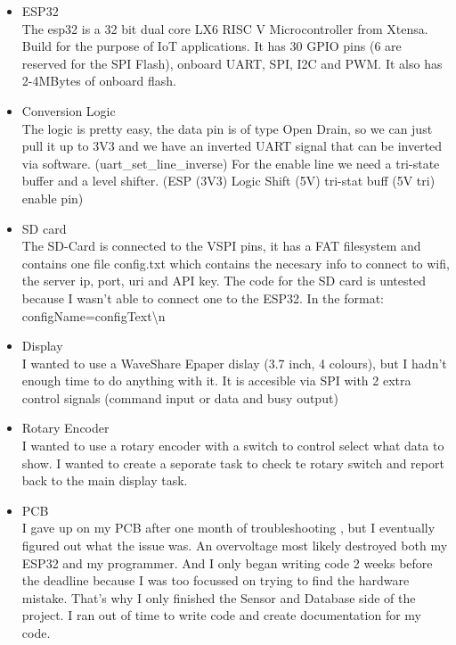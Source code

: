 \documentclass[a4paper,twoside, 12pt]{report}
\theoremstyle{break}
\begin{document}
\begin{itemize}
\item ESP32\\
The esp32 is a 32 bit dual core LX6 RISC V Microcontroller from Xtensa. Build for the purpose of IoT applications. It has 30 GPIO pins (6 are reserved for the SPI Flash), onboard UART, SPI, I2C and PWM. It also has 2-4MBytes of onboard flash.
\item Conversion Logic\\
The logic is pretty easy, the data pin is of type Open Drain, so we can just pull it up to 3V3 and we have an inverted UART signal that can be inverted via software. (uart\_set\_line\_inverse) For the enable line we need a tri-state buffer and a level shifter. (ESP (3V3) \textrightarrow Logic Shift (5V) \textrightarrow tri-stat buff (5V tri) \textrightarrow enable pin)
\item SD card\\
The SD-Card is connected to the VSPI pins, it has a FAT filesystem and contains one file config.txt which contains the necesary info to connect to wifi, the server ip, port, uri and API key. The code for the SD card is untested because I wasn't able to connect one to the ESP32.
In the format: configName=configText\textbackslash n
\item Display\\
I wanted to use a WaveShare Epaper dislay (3.7 inch, 4 colours), but I hadn't enough time to do anything with it. It is accesible via SPI with 2 extra control signals (command input or data and busy output)
\item Rotary Encoder\\
I wanted to use a rotary encoder with a switch to control select what data to show. I wanted to create a seporate task to check te rotary switch and report back to the main display task.
\item PCB \\
I gave up on my PCB after one month of troubleshooting , but I eventually figured out what the issue was. An overvoltage most likely destroyed both my ESP32 and my programmer.
And I only began writing code 2 weeks before the deadline because I was too focussed on trying to find the hardware mistake.
That's why I only finished the Sensor and Database side of the project. I ran out of time to write code and create documentation for my code.
\end{itemize}

\vfill
\end{document}
